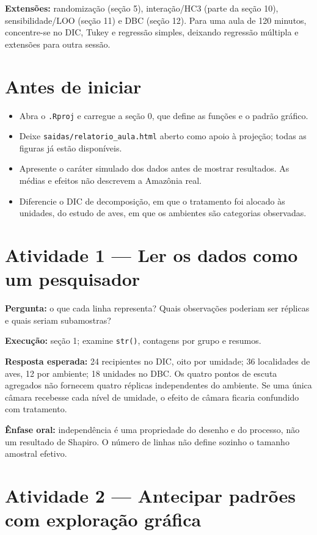 \textbf{Extensões:} randomização (seção 5), interação/HC3 (parte da seção 10), sensibilidade/LOO (seção 11) e DBC (seção 12). Para uma aula de 120 minutos, concentre-se no DIC, Tukey e regressão simples, deixando regressão múltipla e extensões para outra sessão.

\section{Antes de iniciar}

\begin{itemize}
\item Abra o \texttt{.Rproj} e carregue a seção 0, que define as funções e o padrão gráfico.
\item Deixe \texttt{saidas/relatorio\_aula.html} aberto como apoio à projeção; todas as figuras já estão disponíveis.
\item Apresente o caráter simulado dos dados antes de mostrar resultados. As médias e efeitos não descrevem a Amazônia real.
\item Diferencie o DIC de decomposição, em que o tratamento foi alocado às unidades, do estudo de aves, em que os ambientes são categorias observadas.
\end{itemize}

\section{Atividade 1 --- Ler os dados como um pesquisador}

\textbf{Pergunta:} o que cada linha representa? Quais observações poderiam ser réplicas e quais seriam subamostras?

\textbf{Execução:} seção 1; examine \texttt{str()}, contagens por grupo e resumos.

\textbf{Resposta esperada:} 24 recipientes no DIC, oito por umidade; 36 localidades de aves, 12 por ambiente; 18 unidades no DBC. Os quatro pontos de escuta agregados não fornecem quatro réplicas independentes do ambiente. Se uma única câmara recebesse cada nível de umidade, o efeito de câmara ficaria confundido com tratamento.

\textbf{Ênfase oral:} independência é uma propriedade do desenho e do processo, não um resultado de Shapiro. O número de linhas não define sozinho o tamanho amostral efetivo.

\section{Atividade 2 --- Antecipar padrões com exploração gráfica}

